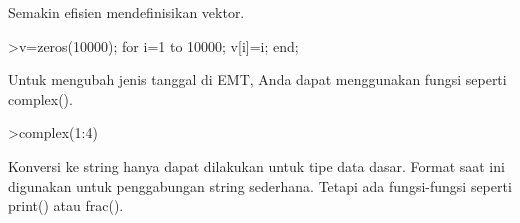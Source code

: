 \documentclass[12pt,Times new roman,letterpaper]{book}
\begin{document}
\begin{eulernootebook}
\begin{eulercomment}
\begin{eulercomment}
\begin{eulernootebook}
\begin{eulercomment}
\begin{eulercomment}
\begin{eulercomment}
\begin{eulercomment}
\begin{eulercomment}
\begin{eulercomment}
\begin{eulercomment}
\begin{eulercomment}
\begin{eulercomment}
\begin{eulercomment}
\begin{eulercomment}
\begin{eulercomment}
Semakin efisien mendefinisikan vektor.
\end{eulercomment}
\begin{eulerprompt}
>v=zeros(10000); for i=1 to 10000; v[i]=i; end;
\end{eulerprompt}
\begin{eulercomment}
Untuk mengubah jenis tanggal di EMT, Anda dapat menggunakan fungsi
seperti complex().
\end{eulercomment}
\begin{eulerprompt}
>complex(1:4)
\end{eulerprompt}
\begin{euleroutput}
  [ 1+0i ,  2+0i ,  3+0i ,  4+0i  ]
\end{euleroutput}
\begin{eulercomment}
Konversi ke string hanya dapat dilakukan untuk tipe data dasar. Format
saat ini digunakan untuk penggabungan string sederhana. Tetapi ada
fungsi-fungsi seperti print() atau frac().


\end{eulercomment}
\end{eulercomment}
\end{eulercomment}
\end{eulercomment}
\end{eulercomment}
\end{eulercomment}
\end{eulercomment}
\end{eulercomment}
\end{eulercomment}
\end{eulercomment}
\end{eulercomment}
\end{eulercomment}
\end{eulernootebook}
\end{eulercomment}
\end{eulercomment}
\end{eulernootebook}
\end{document}
